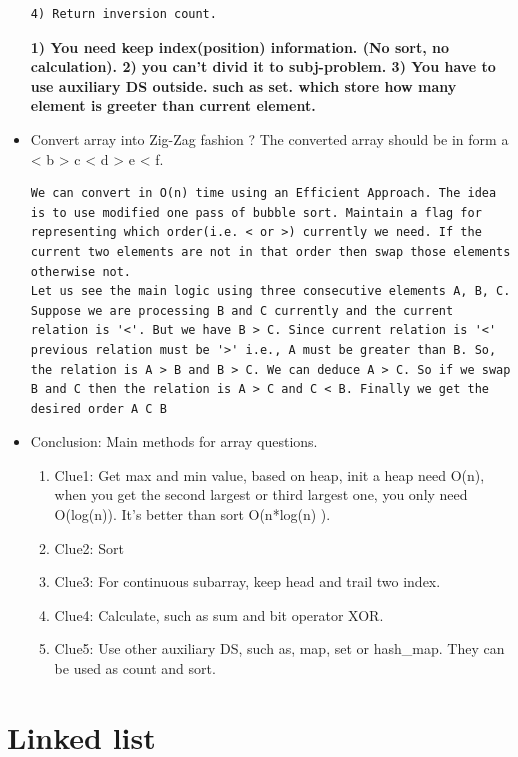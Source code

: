 \documentclass[a4paper,12pt,twoside]{book}
\begin{document}
\begin{itemize}
\begin{lstlisting}[breaklines]
4) Return inversion count.
\end{lstlisting}
\textbf{1) You need keep index(position) information. (No sort, no calculation).  2) you can't divid it to subj-problem. 3) You have to use auxiliary DS outside. such as set. which store how many element is greeter than current element.  }


\item Convert array into Zig-Zag fashion ? The converted array should be in form a < b > c < d > e < f. 
\begin{lstlisting}[breaklines]
We can convert in O(n) time using an Efficient Approach. The idea is to use modified one pass of bubble sort. Maintain a flag for representing which order(i.e. < or >) currently we need. If the current two elements are not in that order then swap those elements otherwise not.
Let us see the main logic using three consecutive elements A, B, C. Suppose we are processing B and C currently and the current relation is '<'. But we have B > C. Since current relation is '<' previous relation must be '>' i.e., A must be greater than B. So, the relation is A > B and B > C. We can deduce A > C. So if we swap B and C then the relation is A > C and C < B. Finally we get the desired order A C B
\end{lstlisting}


\item Conclusion: Main methods for array questions. 
\begin{enumerate}
\item Clue1: Get max and min value, based on heap, init a heap need O(n), when you get the second largest or third largest one, you only need O(log(n)). It's better than sort O(n*log(n) ). 
\item Clue2: Sort
\item Clue3: For continuous subarray, keep head and trail two index.
\item Clue4: Calculate, such as sum and bit operator XOR. 
\item Clue5: Use other auxiliary DS, such as, map, set or hash\_map.  They can be used as count and sort. 
\end{enumerate}

\end{itemize}

\section{Linked list}
\end{document}

